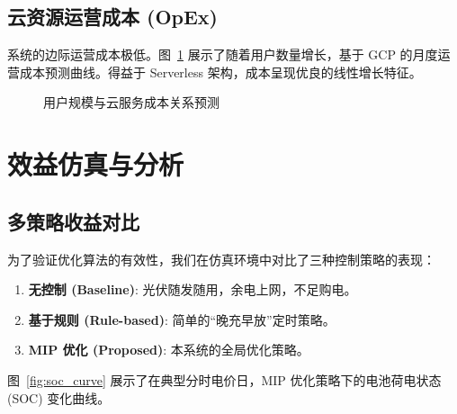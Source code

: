 \subsection{云资源运营成本 (OpEx)}
系统的边际运营成本极低。图~\ref{fig:cloud_cost} 展示了随着用户数量增长，基于 GCP 的月度运营成本预测曲线。得益于 Serverless 架构，成本呈现优良的线性增长特征。

\begin{figure}[htbp]
    \centering
    \caption{用户规模与云服务成本关系预测}
    \label{fig:cloud_cost}
\end{figure}

\section{效益仿真与分析}

\subsection{多策略收益对比}
为了验证优化算法的有效性，我们在仿真环境中对比了三种控制策略的表现：
\begin{enumerate}
    \item \textbf{无控制 (Baseline)}: 光伏随发随用，余电上网，不足购电。
    \item \textbf{基于规则 (Rule-based)}: 简单的“晚充早放”定时策略。
    \item \textbf{MIP 优化 (Proposed)}: 本系统的全局优化策略。
\end{enumerate}

图~\ref{fig:soc_curve} 展示了在典型分时电价日，MIP 优化策略下的电池荷电状态 (SOC) 变化曲线。


